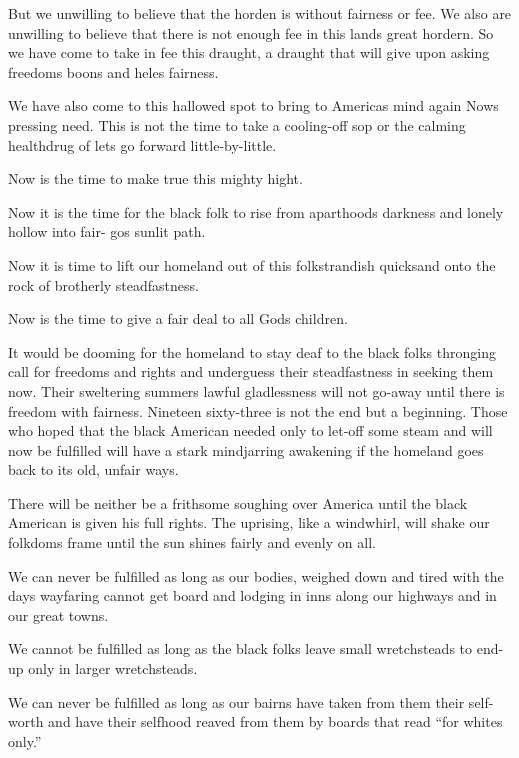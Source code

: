 But we unwilling to believe that the horden is without fairness or
fee. We also are unwilling to believe that there is not enough fee
in this land\textquotesingle{}s great hordern. So we have come to
take in fee this draught, a draught that will give upon asking
freedom\textquotesingle{}s boons and hele\textquotesingle{}s
fairness.

We have also come to this hallowed spot to bring to
America\textquotesingle{}s mind again Now\textquotesingle{}s
pressing need. This is not the time to take a cooling-off sop or
the calming healthdrug of let\textquotesingle{}s go forward
little-by-little.

Now is the time to make true this mighty hight.

Now it is the time for the black folk to rise from
aparthood\textquotesingle{}s darkness and lonely hollow into fair-
go\textquotesingle{}s sunlit path.

Now it is time to lift our homeland out of this folkstrandish
quicksand onto the rock of brotherly steadfastness.

Now is the time to give a fair deal to all God\textquotesingle{}s
children.

It would be dooming for the homeland to stay deaf to the black
folk\textquotesingle{}s thronging call for freedoms and rights and
underguess their steadfastness in seeking them now. Their
sweltering summer\textquotesingle{}s lawful gladlessness will not
go-away until there is freedom with fairness. Nineteen sixty-three
is not the end but a beginning. Those who hoped that the black
American needed only to let-off some steam and will now be
fulfilled will have a stark mindjarring awakening if the homeland
goes back to its old, unfair ways.

There will be neither be a frithsome soughing over America until
the black American is given his full rights. The uprising, like a
windwhirl, will shake our folkdom\textquotesingle{}s frame until
the sun shines fairly and evenly on all.

We can never be fulfilled as long as our bodies, weighed down and
tired with the day\textquotesingle{}s wayfaring cannot get board
and lodging in inns along our highways and in our great towns.

We cannot be fulfilled as long as the black folks leave small
wretchsteads to end-up only in larger wretchsteads.

We can never be fulfilled as long as our bairns have taken from
them their self-worth and have their selfhood reaved from them by
boards that read ``for whites only.''

